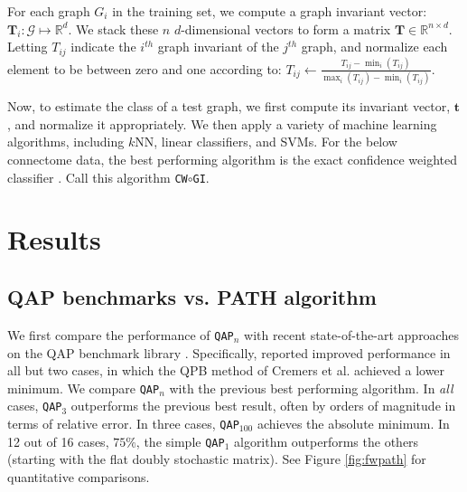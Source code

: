 \documentclass{article} %
\newcommand{\T}{^{\ensuremath{\mathsf{T}}}}           %
\newcommand{\EE}{\mathbb{E}}           %
\providecommand{\mc}[1]{\mathcal{#1}}
\providecommand{\mb}[1]{\boldsymbol{#1}}
\newcommand{\Real}{\mathbb{R}}
\newcommand{\qapa}{\texttt{QAP}$_1$ }
\newcommand{\qapn}{\texttt{QAP$_n$} }
\newcommand{\qapb}{\texttt{QAP$_{100}$} }
\begin{document}
For each graph $G_i$ in the training set, we compute a graph invariant vector: $\mb{T}_i: \mc{G} \mapsto \Real^d$.  We stack these $n$ $d$-dimensional vectors to form a matrix $\mb{T} \in \Real^{n \times d}$.  Letting $T_{ij}$ indicate the $i^{th}$ graph invariant of the $j^{th}$ graph, and normalize each element to be between zero and one according to:  $T_{ij} \leftarrow \frac{T_{ij} - \min_i (T_{ij})}{\max_i(T_{ij}) - \min_i(T_{ij})}$.

Now, to estimate the class of a test graph, we first compute its invariant vector, $\mb{t}$, and normalize it appropriately.  We then apply a variety of machine learning algorithms, including $k$NN, linear classifiers, and SVMs.  For the below connectome data, the best performing algorithm is the exact confidence weighted classifier \cite{Crammer2008}.  Call this algorithm \texttt{CW}$\circ$\texttt{GI}.




\section{Results}

\subsection{QAP benchmarks vs. PATH algorithm}

We first compare the performance of \qapn with recent state-of-the-art approaches on the QAP benchmark library \cite{Burkard1997}.  Specifically, \cite{Zaslavskiy2009} reported improved performance in all but two cases, in which the QPB method of Cremers et al. \cite{Schellewald2001} achieved a lower minimum.  We compare \qapn with the previous best performing algorithm.  In \emph{all} cases, \texttt{QAP}$_3$ outperforms the previous best result, often by orders of magnitude in terms of relative error. In three cases, \qapb achieves the absolute minimum.  In 12 out of 16 cases, $75\%$, the simple \qapa algorithm outperforms the others (starting with the flat doubly stochastic matrix).  See Figure \ref{fig:fwpath} for quantitative comparisons.
\end{document}

